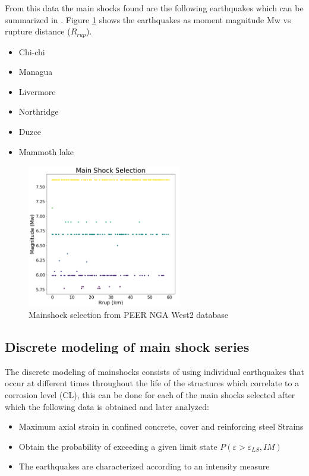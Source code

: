 From this data the main shocks found are the following earthquakes which can be summarized in . Figure \ref{fig:MS_Selection} shows the earthquakes as moment magnitude {Mw} vs rupture distance ($R_{rup}$).

\begin{itemize}
	\item Chi-chi
	\item Managua
	\item Livermore
	\item Northridge
	\item Duzce 
	\item Mammoth lake
\end{itemize}

\begin{figure}[htbp]
	\centering
	\includegraphics[width=0.6\textwidth]{Chapter-4/figs/MainShock_Selection}
	\caption{Mainshock selection from PEER NGA West2 database}
	\label{fig:MS_Selection}
\end{figure}

\subsection{Discrete modeling of main shock series}
The discrete modeling of mainshocks consists of using individual earthquakes that occur at different times throughout the life of the structures which correlate to a corrosion level (CL), this can be done for each of the main shocks selected after which the following data is obtained and later analyzed:

\begin{itemize}
	\item Maximum axial strain in confined concrete, cover and reinforcing steel 
Strains
	\item Obtain the probability of exceeding a given limit state $P(\varepsilon >\varepsilon_{LS},IM)$
	\item The earthquakes are characterized according to an intensity measure

\end{itemize}


